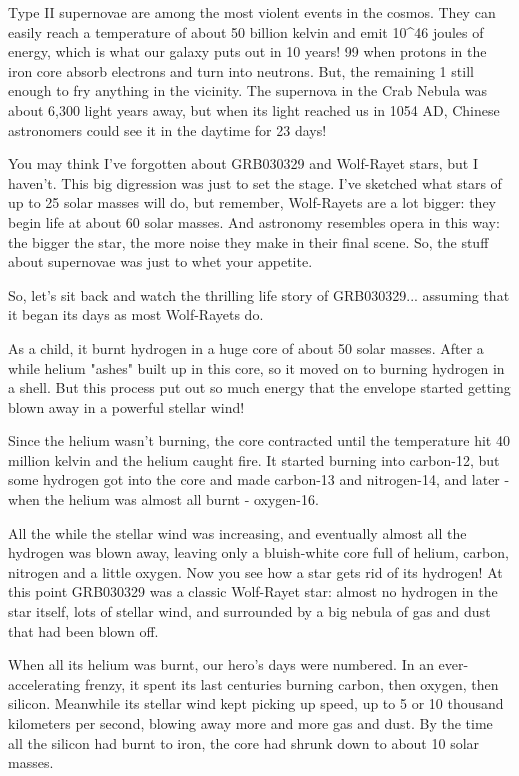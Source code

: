 Type II supernovae are among the most violent events in the cosmos.  
They can easily reach a temperature of about 50 billion kelvin and 
emit 10^{46} joules of energy, which is what our galaxy puts out in 
10 years!   99%
when protons in the iron core absorb electrons and turn into neutrons.
But, the remaining 1%
still enough to fry anything in the vicinity.  The supernova in the 
Crab Nebula was about 6,300 light years away, but when its light reached
us in 1054 AD, Chinese astronomers could see it in the daytime for 23 
days!  

You may think I've forgotten about GRB030329 and Wolf-Rayet stars,
but I haven't.  This big digression was just to set the stage.  
I've sketched what stars of up to 25 solar masses will do, but remember,
Wolf-Rayets are a lot bigger: they begin life at about 60 solar masses.
And astronomy resembles opera in this way: the bigger the star, the more 
noise they make in their final scene.  So, the stuff about supernovae 
was just to whet your appetite.

So, let's sit back and watch the thrilling life story of GRB030329... 
assuming that it began its days as most Wolf-Rayets do.  

As a child, it burnt hydrogen in a huge core of about 50 solar 
masses.  After a while helium "ashes" built up in this core, so it 
moved on to burning hydrogen in a shell.  But this process put out 
so much energy that the envelope started getting blown away in a 
powerful stellar wind!   

Since the helium wasn't burning, the core contracted until the 
temperature hit 40 million kelvin and the helium caught fire.  It 
started burning into carbon-12, but some hydrogen got into the core 
and made carbon-13 and nitrogen-14, and later - when the helium was 
almost all burnt - oxygen-16.  

All the while the stellar wind was increasing, and eventually almost
all the hydrogen was blown away, leaving only a bluish-white core 
full of helium, carbon, nitrogen and a little oxygen.  Now you see 
how a star gets rid of its hydrogen!  At this point GRB030329 was a
classic Wolf-Rayet star: almost no hydrogen in the star itself, 
lots of stellar wind, and surrounded by a big nebula of gas and dust 
that had been blown off.  

When all its helium was burnt, our hero's days were numbered.
In an ever-accelerating frenzy, it spent its last centuries burning
carbon, then oxygen, then silicon.  Meanwhile its stellar wind kept 
picking up speed, up to 5 or 10 thousand kilometers per second, blowing 
away more and more gas and dust.  By the time all the silicon had burnt
to iron, the core had shrunk down to about 10 solar masses.  

